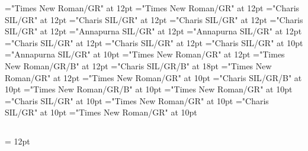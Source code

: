 \documentclass[a4paper,twoside]{article}
\begin{document}
\pagestyle{plain}
\sloppy
\setlength{\parfillskip}{0pt plus 1fil}
\font\diven="Times New Roman/GR" at 12pt
\font\spanen="Times New Roman/GR" at 12pt
\font\divggofonipaxemic="Charis SIL/GR" at 12pt
\font\spanggofonipaxemic="Charis SIL/GR" at 12pt
\font\divte="Charis SIL/GR" at 12pt
\font\spante="Charis SIL/GR" at 12pt
\font\divhi="Annapurna SIL/GR" at 12pt
\font\spanhi="Annapurna SIL/GR" at 12pt
\font\divggoTeluIN="Charis SIL/GR" at 12pt
\font\spanggoTeluIN="Charis SIL/GR" at 12pt
\font\xitemte="Charis SIL/GR" at 10pt
\font\xitemhi="Annapurna SIL/GR" at 10pt
\font\xitemtpi="Times New Roman/GR" at 12pt
\font{}="Times New Roman/GR/B" at 12pt
\font{}="Charis SIL/GR/B" at 18pt
\font{}="Times New Roman/GR" at 12pt
\font\entryletDatadicBody="Times New Roman/GR" at 10pt
\font\headwordggoTeluINentryletDatadicBody="Charis SIL/GR/B" at 10pt
\font\spanenheadwordggoTeluINentryletDatadicBody="Times New Roman/GR/B" at 10pt
\font\pronunciationsentryletDatadicBody="Times New Roman/GR" at 10pt
\font\pronunciationggofonipaxemicpronunciationsentryletDatadicBody="Charis SIL/GR" at 10pt
\font\spanenpronunciationggofonipaxemicpronunciationsentryletDatadicBody="Times New Roman/GR" at 10pt
\font\spanggofonipaxemicpronunciationggofonipaxemicpronunciationsentryletDatadicBody="Charis SIL/GR" at 10pt
\font\spanenpronunciationsentryletDatadicBody="Times New Roman/GR" at 10pt

\mbox{} 
\newpage 
\newpage 
\setcounter{page}{1} 
\pagestyle{fancy} 
\begin{center}\begin{center}

\section*{}\end{center}
\end{center}\setlength{\columnsep}{12pt} 
\setlength\columnseprule{0.4pt} 
\begin{multicols}{2}{\raggedright} 
\hangindent= 12pt
 \spanenpronunciationggofonipaxemicpronunciationsentryletDatadicBody{[}\spanenpronunciationggofonipaxemicpronunciationsentryletDatadicBody{]} 
 \end{multicols}
\end{document}
